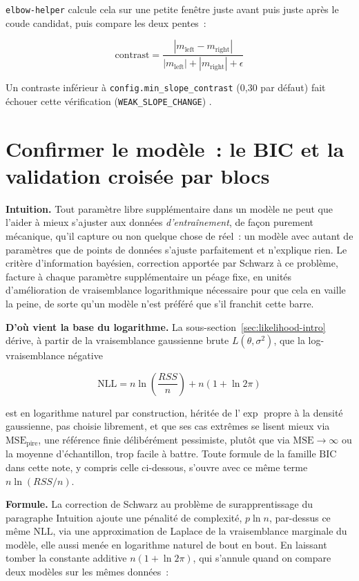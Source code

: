 \documentclass[11pt]{article}
\newcommand{\code}[1]{\texttt{#1}}
\begin{document}
\code{elbow-helper} calcule cela sur une petite fenêtre juste avant puis
juste après le coude candidat, puis compare les deux pentes~:

\begin{equation}
\text{contrast} = \frac{|m_{\text{left}} - m_{\text{right}}|}{|m_{\text{left}}| + |m_{\text{right}}| + \epsilon}
\end{equation}

Un contraste inférieur à \code{config.min\_slope\_contrast} (0,30 par
défaut) fait échouer cette vérification (\code{WEAK\_SLOPE\_CHANGE})
\citep{theil1950} \citep{sen1968}.

\section{Confirmer le modèle~: le BIC et la validation croisée par blocs}
\label{sec:bic-vc}

\textbf{Intuition.} Tout paramètre libre supplémentaire dans un modèle ne
peut que l'aider à mieux s'ajuster aux données \emph{d'entraînement}, de
façon purement mécanique, qu'il capture ou non quelque chose de réel~: un
modèle avec autant de paramètres que de points de données s'ajuste
parfaitement et n'explique rien. Le critère d'information bayésien,
correction apportée par Schwarz à ce problème, facture à chaque paramètre
supplémentaire un péage fixe, en unités d'amélioration de vraisemblance
logarithmique nécessaire pour que cela en vaille la peine, de sorte qu'un
modèle n'est préféré que s'il franchit cette barre.

\textbf{D'où vient la base du logarithme.} La sous-section~\ref{sec:likelihood-intro}
dérive, à partir de la vraisemblance gaussienne brute $L(\theta,\sigma^2)$,
que la log-vraisemblance négative

\begin{equation}
\mathrm{NLL} = n \ln\!\left(\frac{RSS}{n}\right) + n(1 + \ln 2\pi)
\end{equation}

est en logarithme naturel par construction, héritée de l'$\exp$ propre à
la densité gaussienne, pas choisie librement, et que ses cas extrêmes se
lisent mieux via $\mathrm{MSE}_{\text{pire}}$, une référence finie
délibérément pessimiste, plutôt que via $\mathrm{MSE} \to \infty$ ou la
moyenne d'échantillon, trop facile à battre. Toute formule de la famille
$\mathrm{BIC}$ dans cette note, y compris celle ci-dessous, s'ouvre avec
ce même terme $n\ln(RSS/n)$.

\textbf{Formule.} La correction de Schwarz au problème de surapprentissage
du paragraphe Intuition ajoute une pénalité de complexité, $p \ln n$,
par-dessus ce même $\mathrm{NLL}$, via une approximation de Laplace de la
vraisemblance marginale du modèle, elle aussi menée en logarithme naturel
de bout en bout. En laissant tomber la constante additive $n(1+\ln 2\pi)$,
qui s'annule quand on compare deux modèles sur les mêmes données~:
\end{document}
